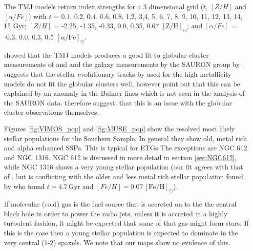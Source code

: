		The TMJ models return index strengths for a 3 dimensional grid ($t$, $[Z/H]$ and $[\alpha/Fe]$) with $t$ = 0.1, 0.2, 0.4, 0.6, 0.8, 1,2, 3,4, 5, 6, 7, 8, 9, 10, 11, 12, 13, 14, 15 Gyr; $[Z/H]$ = -2.25, -1.35, -0.33, 0.0, 0.35, 0.67 $\mathrm{[Z/H]_\odot}$; and $[\alpha/Fe]$ = -0.3, 0.0, 0.3, 0.5 $\mathrm{[\alpha/Fe]_\odot}$.

		\citet{Thomas2010} showed that the TMJ models produces a good fit to globular cluster measurements of \citet{Puzia2002} and \citet{Schiavon2005} and the galaxy measurements by the SAURON group by \citet{Kuntschner2010}. \citet{Conroy2010} suggests that the stellar evolutionary tracks by \citet{Girardi2000} used for the high metallicity models do not fit the globular clusters well, however \citet{Thomas2010} point out that this can be explained by an anomaly in the Balmer lines which is not seen in the analysis of the SAURON data. \citet{Thomas2010} therefore suggest, that this is an issue with the globular cluster observations themselves. 

		Figures \ref{fig:VIMOS_pop} and \ref{fig:MUSE_pop} show the resolved most likely stellar populations for the Southern Sample. In general they show old, metal rich and alpha enhanced SSPs. This is typical for ETGs %
		The exceptions are NGC 612 and NGC 1316. NGC 612 is discussed in more detail in section \ref{sec:NGC612}, while NGC 1316 shows a very young stellar population (our fit agrees with that of \citealt{Kuntschner2000}, but is conflicting with the older and less metal rich stellar population found by \citealt{Koleva2011} who found $t=4.7\,\mathrm{Gyr}$ and $[Fe/H]=0.07 \,\mathrm{[Fe/H]_\odot}$). 

		If molecular (cold) gas is the fuel source that is accreted on to the the central black hole in order to power the radio jets, unless it is accreted in a highly turbulent fashion, it might be expected that some of that gas might form stars. If this is the case then a young stellar population is expected to dominate in the very central (1-2) spaxels. We note that our maps show no evidence of this. 


